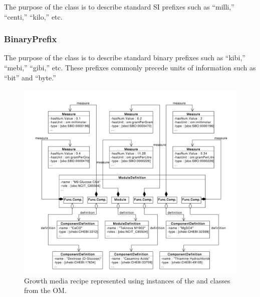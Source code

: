 The purpose of the  class is to describe standard SI prefixes such as ``milli,'' ``centi,'' ``kilo,'' etc. 


\subsubsection{BinaryPrefix}
\label{sec:BinaryPrefix}

The purpose of the  class is to describe standard binary prefixes such as ``kibi,'' ``mebi,'' ``gibi,'' etc. These prefixes commonly precede units of information such as ``bit'' and ``byte.''

\begin{figure}[ht]
\begin{center}
\includegraphics[width=\linewidth]{uml/media_example}
\caption[]{Growth media recipe represented using instances of the  and  classes from the OM.}
\label{uml:media_example}
\end{center}
\end{figure}
